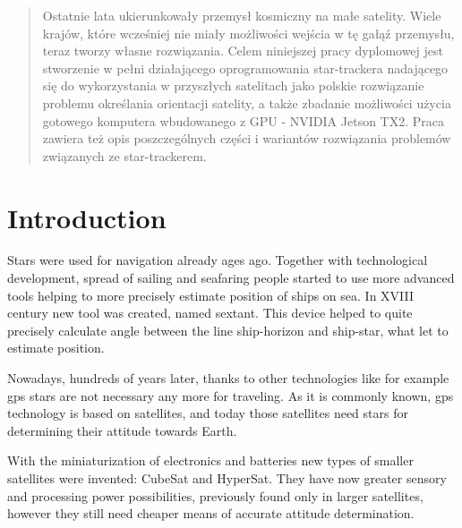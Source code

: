 \documentclass[12pt,a4paper,twoside]{article}
\begin{document}
\begin{otherlanguage}{polish}
\begin{abstract}
Ostatnie lata ukierunkowały przemysł kosmiczny na małe satelity. Wiele krajów, które wcześniej nie miały możliwości wejścia w tę gałąź przemysłu, teraz tworzy własne rozwiązania. Celem niniejszej pracy dyplomowej jest stworzenie w pełni działającego oprogramowania star-trackera nadającego się do wykorzystania w przyszłych satelitach jako polskie rozwiązanie problemu określania orientacji satelity, a także zbadanie możliwości użycia gotowego komputera wbudowanego z GPU - NVIDIA Jetson TX2. Praca zawiera też opis poszczególnych części i wariantów rozwiązania problemów związanych ze star-trackerem.
\end{abstract}
\end{otherlanguage}
\newpage
\thispagestyle{empty}
\phantom{a}
\vfill
\newpage
{}
\setcounter{page}{3}
\tableofcontents

\newpage
\setlength{\parindent}{1cm}
\setlength{\parskip}{\baselineskip}%



\glsaddall
\setlength{\glsdescwidth}{0.5\linewidth}
\setlength{\glspagelistwidth}{0.1\linewidth}

\printnoidxglossary[type=acronym,sort=letter]
\newpage

\printnoidxglossary[type=symbols,sort=use]

\newpage


\section{Introduction}
Stars were used for navigation already ages ago. Together with technological development, spread of sailing and seafaring people started to use more advanced tools helping to more precisely estimate position of ships on sea. In XVIII century new tool was created, named sextant. This device helped to quite precisely calculate angle between the line ship-horizon and ship-star, what let to estimate position.

Nowadays, hundreds of years later, thanks to other technologies like for example \gls{gps} stars are not necessary any more for traveling. As it is commonly known, \gls{gps} technology is based on satellites, and today those satellites need stars for determining their attitude towards Earth.

With the miniaturization of electronics and batteries new types of smaller satellites were invented: CubeSat and HyperSat. They have now greater sensory and processing power possibilities, previously found only in larger satellites, however they still need cheaper means of accurate attitude determination.
\end{document}
